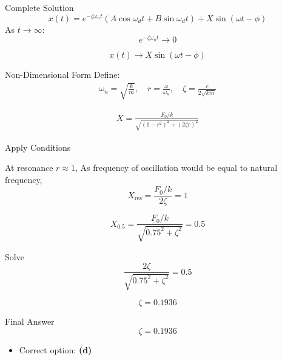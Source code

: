 \documentclass{beamer}
\begin{document}
\begin{frame}{Complete Solution}
\[
x(t) =
e^{-\zeta \omega_n t}(A\cos \omega_d t + B\sin \omega_d t)
+ X \sin(\omega t - \phi)
\]
As $t \to \infty$:
\[
e^{-\zeta \omega_n t} \to 0
\]

\[
x(t) \to X \sin(\omega t - \phi)
\]
\end{frame}



\begin{frame}{Non-Dimensional Form}
Define:
\begin{align}
\omega_n = \sqrt{\frac{k}{m}}, \quad
r = \frac{\omega}{\omega_n}, \quad
\zeta = \frac{c}{2\sqrt{km}}
\end{align}

\begin{align}
X = \frac{F_0/k}{\sqrt{(1 - r^2)^2 + (2\zeta r)^2}}
\end{align}
\end{frame}
\begin{frame}{Apply Conditions}

At resonance $r \approx 1$, As frequency of oscillation would be equal to natural frequency,
\[
X_{\text{res}} = \frac{F_0/k}{2\zeta} = 1
\]

\[
X_{0.5} = \frac{F_0/k}{\sqrt{0.75^2 + \zeta^2}} = 0.5
\]
\end{frame}

\begin{frame}{Solve}
\[
\frac{2\zeta}{\sqrt{0.75^2 + \zeta^2}} = 0.5
\]

\[
\zeta = 0.1936
\]
\end{frame}

\begin{frame}{Final Answer}
\[
\boxed{\zeta = 0.1936}
\]

\begin{itemize}
    \item Correct option: \textbf{(d)}
\end{itemize}
\end{frame}
\end{document}
